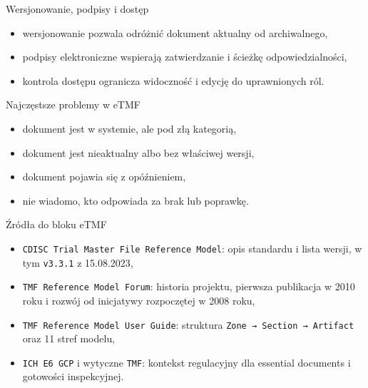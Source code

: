 \begin{frame}{Wersjonowanie, podpisy i dostęp}
  \begin{itemize}
    \item wersjonowanie pozwala odróżnić dokument aktualny od archiwalnego,
    \item podpisy elektroniczne wspierają zatwierdzanie i ścieżkę odpowiedzialności,
    \item kontrola dostępu ogranicza widoczność i edycję do uprawnionych ról.
  \end{itemize}
\end{frame}

\begin{frame}{Najczęstsze problemy w eTMF}
  \begin{itemize}
    \item dokument jest w systemie, ale pod złą kategorią,
    \item dokument jest nieaktualny albo bez właściwej wersji,
    \item dokument pojawia się z opóźnieniem,
    \item nie wiadomo, kto odpowiada za brak lub poprawkę.
  \end{itemize}
\end{frame}



\begin{frame}{Źródła do bloku eTMF}
  \begin{itemize}
    \item \texttt{CDISC Trial Master File Reference Model}: opis standardu i lista wersji, w tym \texttt{v3.3.1} z 15.08.2023,
    \item \texttt{TMF Reference Model Forum}: historia projektu, pierwsza publikacja w 2010 roku i rozwój od inicjatywy rozpoczętej w 2008 roku,
    \item \texttt{TMF Reference Model User Guide}: struktura \texttt{Zone → Section → Artifact} oraz 11 stref modelu,
    \item \texttt{ICH E6 GCP} i wytyczne \texttt{TMF}: kontekst regulacyjny dla essential documents i gotowości inspekcyjnej.
  \end{itemize}
\end{frame}
